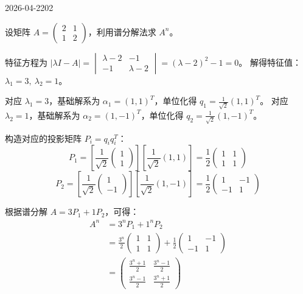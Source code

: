 \begin{mistake}{2026-04-22}{02}

\begin{problemcontent}
设矩阵 \(A = \begin{pmatrix} 2 & 1 \\ 1 & 2 \end{pmatrix}\)，利用谱分解法求 \(A^n\)。
\end{problemcontent}

\begin{solutioncontent}
特征方程为 \(|\lambda I - A| = \begin{vmatrix} \lambda - 2 & -1 \\ -1 & \lambda - 2 \end{vmatrix} = (\lambda - 2)^2 - 1 = 0\)。
解得特征值：\(\lambda_1 = 3, \ \lambda_2 = 1\)。

对应 \(\lambda_1 = 3\)，基础解系为 \(\alpha_1 = (1, 1)^T\)，单位化得 \(q_1 = \frac{1}{\sqrt{2}}(1, 1)^T\)。
对应 \(\lambda_2 = 1\)，基础解系为 \(\alpha_2 = (1, -1)^T\)，单位化得 \(q_2 = \frac{1}{\sqrt{2}}(1, -1)^T\)。

构造对应的投影矩阵 \(P_i = q_i q_i^T\)：
\[
P_1 = \left[ \frac{1}{\sqrt{2}} \begin{pmatrix} 1 \\ 1 \end{pmatrix} \right] \left[ \frac{1}{\sqrt{2}} (1, 1) \right] = \frac{1}{2} \begin{pmatrix} 1 & 1 \\ 1 & 1 \end{pmatrix}
\]
\[
P_2 = \left[ \frac{1}{\sqrt{2}} \begin{pmatrix} 1 \\ -1 \end{pmatrix} \right] \left[ \frac{1}{\sqrt{2}} (1, -1) \right] = \frac{1}{2} \begin{pmatrix} 1 & -1 \\ -1 & 1 \end{pmatrix}
\]

根据谱分解 \(A = 3P_1 + 1P_2\)，可得：
\[
\begin{aligned}
A^n &= 3^n P_1 + 1^n P_2 \\
&= \frac{3^n}{2} \begin{pmatrix} 1 & 1 \\ 1 & 1 \end{pmatrix} + \frac{1}{2} \begin{pmatrix} 1 & -1 \\ -1 & 1 \end{pmatrix} \\
&= \begin{pmatrix} \frac{3^n + 1}{2} & \frac{3^n - 1}{2} \\ \frac{3^n - 1}{2} & \frac{3^n + 1}{2} \end{pmatrix}
\end{aligned}
\]
\end{solutioncontent}


\end{mistake}
